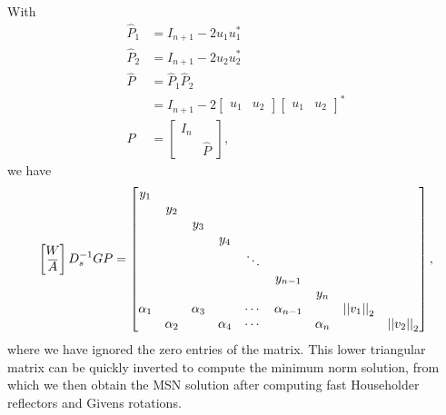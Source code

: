 With
%
\begin{align}
    \widehat{P}_{1} &= I_{n+1} - 2u_{1}u_{1}^{*} \nonumber\\
    \widehat{P}_{2} &= I_{n+1} - 2u_{2}u_{2}^{*} \nonumber\\
    \widehat{P} &= \widehat{P}_{1}\widehat{P}_{2} \nonumber\\
        &= I_{n+1} - 2\begin{bmatrix} u_{1} & u_{2} \end{bmatrix}
            \begin{bmatrix} u_{1} & u_{2} \end{bmatrix}^{*} \nonumber\\
    P &= \begin{bmatrix} I_{n} & \\ & \widehat{P} \end{bmatrix},
\end{align}
%
we have
%
\begin{equation}
    \begin{bmatrix} W \\ \overline{A} \end{bmatrix}
            D_{s}^{-1}GP = \begin{bmatrix}
        y_{1} & & & & \\
        & y_{2} & & & \\
        & & y_{3} & & \\
        & & & y_{4} & \\
        & & & & \ddots \\
        & & & & & y_{n-1} & & \\
        & & & & & & y_{n} & \\
        \alpha_{1} & & \alpha_{3} & & \cdots & \alpha_{n-1} & &
            \left| \left| v_{1} \right| \right|_{2} \\
        & \alpha_{2} & & \alpha_{4} & \cdots & & \alpha_{n} & &
            \left| \left| v_{2} \right| \right|_{2} \\
    \end{bmatrix},
\end{equation}
%
where we have ignored the zero entries of the matrix.
This lower triangular matrix can be quickly inverted to compute the minimum
norm solution, from which we then obtain the MSN solution after
computing fast Householder reflectors and Givens rotations.


